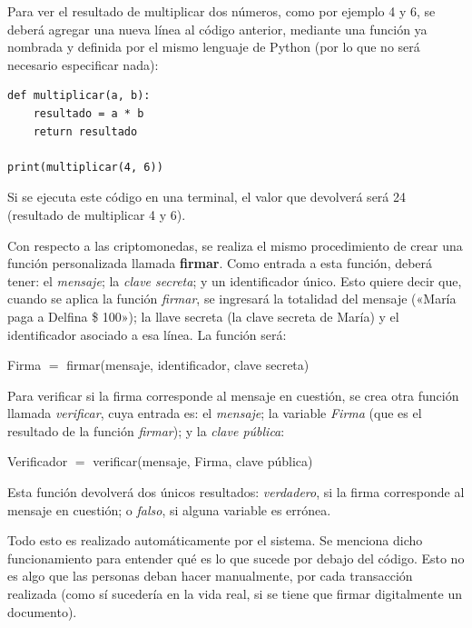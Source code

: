 \documentclass[12pt,a4paper,twoside]{book}
\begin{document}
Para ver el resultado de multiplicar dos números, como por ejemplo 4 y 6, se deberá agregar una nueva línea al código anterior, mediante una función ya nombrada y definida por el mismo lenguaje de Python (por lo que no será necesario especificar nada):

\lstset{language=Python, firstnumber=auto, showstringspaces=false, numbers=left}
\begin{lstlisting}
def multiplicar(a, b):
    resultado = a * b
    return resultado

print(multiplicar(4, 6))
\end{lstlisting}

Si se ejecuta este código en una terminal, el valor que devolverá será 24 (resultado de multiplicar 4 y 6).

Con respecto a las criptomonedas, se realiza el mismo procedimiento de crear una función personalizada llamada \textbf{firmar}. Como entrada a esta función, deberá tener: el \textit{mensaje}; la \textit{clave secreta}; y un identificador único. Esto quiere decir que, cuando se aplica la función \textit{firmar}, se ingresará la totalidad del mensaje («María paga a Delfina \$ 100»); la llave secreta (la clave secreta de María) y el identificador asociado a esa línea. La función será:

\begin{center}
Firma $ = $ firmar(mensaje, identificador, clave secreta)
\end{center}

Para verificar si la firma corresponde al mensaje en cuestión, se crea otra función llamada \textit{verificar}, cuya entrada es: el \textit{mensaje}; la variable \textit{Firma} (que es el resultado de la función \textit{firmar}); y la \textit{clave pública}:

\begin{center}
Verificador $ = $ verificar(mensaje, Firma, clave pública)
\end{center}

Esta función devolverá dos únicos resultados: \textit{verdadero}, si la firma corresponde al mensaje en cuestión; o \textit{falso}, si alguna variable es errónea.

Todo esto es realizado automáticamente por el sistema. Se menciona dicho funcionamiento para entender qué es lo que sucede por debajo del código. Esto no es algo que las personas deban hacer manualmente, por cada transacción realizada (como sí sucedería en la vida real, si se tiene que firmar digitalmente un documento).
\end{document}
